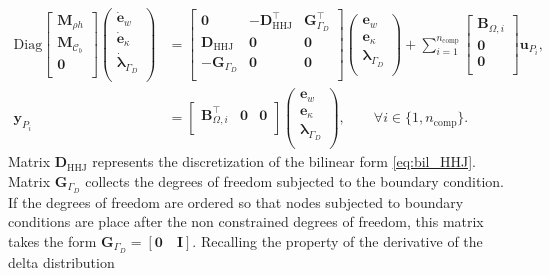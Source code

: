 \begin{equation}
\begin{aligned}
\mathrm{Diag}
\begin{bmatrix}
\mathbf{M}_{\rho h}\\
\mathbf{M}_{\bm{\mathcal{C}}_b}\\
\mathbf{0}\\
\end{bmatrix}
\begin{pmatrix}
\dot{\mathbf{e}}_{w} \\
\dot{\mathbf{e}}_{\kappa} \\
\dot{\bm{\lambda}}_{\Gamma_D} \\
\end{pmatrix}
&= \begin{bmatrix}
\mathbf{0} & - \mathbf{D}_{\mathrm{HHJ}}^\top & \mathbf{G}_{\Gamma_D}^\top\\
\mathbf{D}_{\mathrm{HHJ}} & \mathbf{0} & \mathbf{0}\\
-\mathbf{G}_{\Gamma_D} & \mathbf{0} & \mathbf{0}\\
\end{bmatrix} 
\begin{pmatrix}
{\mathbf{e}}_{w} \\
{\mathbf{e}}_{\kappa} \\
{\bm{\lambda}}_{\Gamma_D} \\
\end{pmatrix} + \sum_{i = 1}^{n_{\text{comp}}}
\begin{bmatrix}
\mathbf{B}_{\Omega, i} \\
\mathbf{0}\\
\mathbf{0}\\
\end{bmatrix}\mathbf{u}_{P_i}, \\
\mathbf{y}_{P_i}
&= \begin{bmatrix}
\mathbf{B}_{\Omega, i}^\top &  \mathbf{0} &  \mathbf{0} \\
\end{bmatrix}
\begin{pmatrix}
{\mathbf{e}}_{w} \\
{\mathbf{e}}_{\kappa} \\
{\bm{\lambda}}_{\Gamma_D} \\
\end{pmatrix}, \qquad \forall i \in \{1, n_{\text{comp}}\}.
\end{aligned}
\end{equation}
Matrix $\mathbf{D}_{\mathrm{HHJ}}$ represents the discretization of the bilinear form \eqref{eq:bil_HHJ}. Matrix $\mathbf{G}_{\Gamma_D}$ collects the degrees of freedom subjected to the boundary condition. If the degrees of freedom are ordered so that nodes subjected to boundary conditions are place after the non constrained degrees of freedom, this matrix takes the form $\mathbf{G}_{\Gamma_D}= [\mathbf{0} \quad \mathbf{I}]$. Recalling the property of the derivative of the delta distribution 
